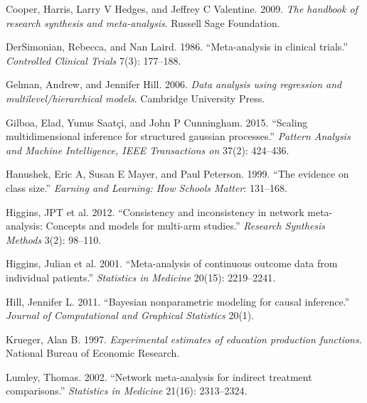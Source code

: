 Cooper, Harris, Larry V Hedges, and Jeffrey C Valentine. 2009. \emph{The
handbook of research synthesis and meta-analysis}. Russell Sage
Foundation.

DerSimonian, Rebecca, and Nan Laird. 1986. ``Meta-analysis in clinical
trials.'' \emph{Controlled Clinical Trials} 7(3): 177--188.

Gelman, Andrew, and Jennifer Hill. 2006. \emph{Data analysis using
regression and multilevel/hierarchical models}. Cambridge University
Press.

Gilboa, Elad, Yunus Saatçi, and John P Cunningham. 2015. ``Scaling
multidimensional inference for structured gaussian processes.''
\emph{Pattern Analysis and Machine Intelligence, IEEE Transactions on}
37(2): 424--436.

Hanushek, Eric A, Susan E Mayer, and Paul Peterson. 1999. ``The evidence
on class size.'' \emph{Earning and Learning: How Schools Matter}:
131--168.

Higgins, JPT et al. 2012. ``Consistency and inconsistency in network
meta-analysis: Concepts and models for multi-arm studies.''
\emph{Research Synthesis Methods} 3(2): 98--110.

Higgins, Julian et al. 2001. ``Meta-analysis of continuous outcome data
from individual patients.'' \emph{Statistics in Medicine} 20(15):
2219--2241.

Hill, Jennifer L. 2011. ``Bayesian nonparametric modeling for causal
inference.'' \emph{Journal of Computational and Graphical Statistics}
20(1).

Krueger, Alan B. 1997. \emph{Experimental estimates of education
production functions}. National Bureau of Economic Research.

Lumley, Thomas. 2002. ``Network meta-analysis for indirect treatment
comparisons.'' \emph{Statistics in Medicine} 21(16): 2313--2324.


